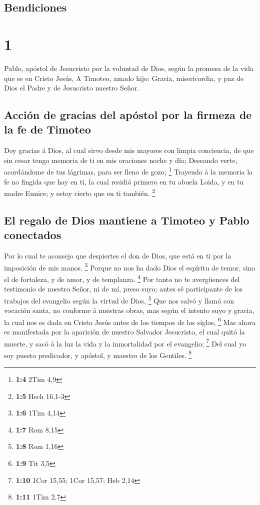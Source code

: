 \hypertarget{bendiciones}{%
\subsection{Bendiciones}\label{bendiciones}}

\hypertarget{section}{%
\section{1}\label{section}}

 Pablo, apóstol de Jesucristo por la voluntad de Dios,
según la promesa de la vida que es en Cristo Jesús,  A
Timoteo, amado hijo: Gracia, misericordia, y paz de Dios el Padre y de
Jesucristo nuestro Señor.

\hypertarget{acciuxf3n-de-gracias-del-apuxf3stol-por-la-firmeza-de-la-fe-de-timoteo}{%
\subsection{Acción de gracias del apóstol por la firmeza de la fe de
Timoteo}\label{acciuxf3n-de-gracias-del-apuxf3stol-por-la-firmeza-de-la-fe-de-timoteo}}

 Doy gracias á Dios, al cual sirvo desde mis mayores con
limpia conciencia, de que sin cesar tengo memoria de ti en mis oraciones
noche y día;  Deseando verte, acordándome de tus lágrimas,
para ser lleno de gozo; \footnote{\textbf{1:4} 2Tim 4,9} 
Trayendo á la memoria la fe no fingida que hay en ti, la cual residió
primero en tu abuela Loida, y en tu madre Eunice; y estoy cierto que en
ti también. \footnote{\textbf{1:5} Hech 16,1-3}

\hypertarget{el-regalo-de-dios-mantiene-a-timoteo-y-pablo-conectados}{%
\subsection{El regalo de Dios mantiene a Timoteo y Pablo
conectados}\label{el-regalo-de-dios-mantiene-a-timoteo-y-pablo-conectados}}

 Por lo cual te aconsejo que despiertes el don de Dios,
que está en ti por la imposición de mis manos. \footnote{\textbf{1:6}
  1Tim 4,14}  Porque no nos ha dado Dios el espíritu de
temor, sino el de fortaleza, y de amor, y de templanza. \footnote{\textbf{1:7}
  Rom 8,15}  Por tanto no te avergüences del testimonio de
nuestro Señor, ni de mí, preso suyo; antes sé participante de los
trabajos del evangelio según la virtud de Dios, \footnote{\textbf{1:8}
  Rom 1,16}  Que nos salvó y llamó con vocación santa, no
conforme á nuestras obras, mas según el intento suyo y gracia, la cual
nos es dada en Cristo Jesús antes de los tiempos de los siglos,
\footnote{\textbf{1:9} Tit 3,5}  Mas ahora es manifestada
por la aparición de nuestro Salvador Jesucristo, el cual quitó la
muerte, y sacó á la luz la vida y la inmortalidad por el evangelio;
\footnote{\textbf{1:10} 1Cor 15,55; 1Cor 15,57; Heb 2,14}
 Del cual yo soy puesto predicador, y apóstol, y maestro
de los Gentiles. \footnote{\textbf{1:11} 1Tim 2,7}

